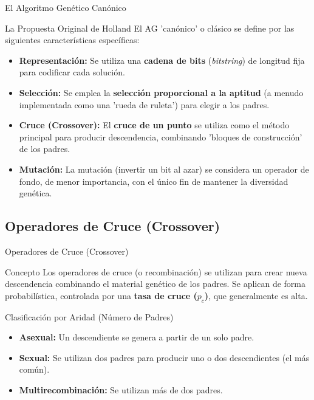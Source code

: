 \documentclass[aspectratio=169,xcolor=dvipsnames]{beamer}
\begin{document}
\begin{frame}{El Algoritmo Genético Canónico}
    \begin{block}{La Propuesta Original de Holland}
    El AG 'canónico' o clásico se define por las siguientes características específicas:
    \end{block}
    
    \begin{itemize}
        \item \textbf{Representación:} Se utiliza una \textbf{cadena de bits} (\textit{bitstring}) de longitud fija para codificar cada solución. \pause
        
        \item \textbf{Selección:} Se emplea la \textbf{selección proporcional a la aptitud} (a menudo implementada como una 'rueda de ruleta') para elegir a los padres. \pause
        
        \item \textbf{Cruce (Crossover):} El \textbf{cruce de un punto} se utiliza como el método principal para producir descendencia, combinando 'bloques de construcción' de los padres. \pause
        
        \item \textbf{Mutación:} La mutación (invertir un bit al azar) se considera un operador de fondo, de menor importancia, con el único fin de mantener la diversidad genética.
    \end{itemize}
\end{frame}

\subsection{Operadores de Cruce (Crossover)}

\begin{frame}{Operadores de Cruce (Crossover)}
    \begin{block}{Concepto}
    Los operadores de cruce (o recombinación) se utilizan para crear nueva descendencia combinando el material genético de los padres. Se aplican de forma probabilística, controlada por una \textbf{tasa de cruce ($p_c$)}, que generalmente es alta.
    \end{block}
    
    \begin{alertblock}{Clasificación por Aridad (Número de Padres)}
        \begin{itemize}
            \item \textbf{Asexual:} Un descendiente se genera a partir de un solo padre.
            \item \textbf{Sexual:} Se utilizan dos padres para producir uno o dos descendientes (el más común).
            \item \textbf{Multirecombinación:} Se utilizan más de dos padres.
        \end{itemize}
    \end{alertblock}
\end{frame}
\end{document}
